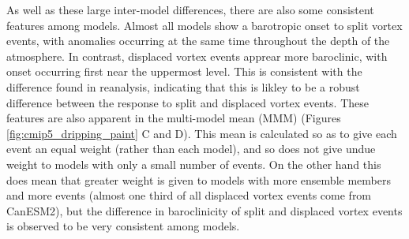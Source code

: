 As well as these large inter-model differences, there are also some consistent
features among models. Almost all models show a barotropic onset to split vortex
events, with anomalies occurring at the same time throughout the depth of the
atmosphere. In contrast, displaced vortex events apprear more baroclinic, with
onset occurring first near the uppermost level. This is consistent with the
difference found in reanalysis, indicating that this is likley to be a robust
difference between the response to split and displaced vortex events. These
features are also apparent in the multi-model mean (MMM) (Figures
\ref{fig:cmip5_dripping_paint} C and D). This mean is calculated so as to give
each event an equal weight (rather than each model), and so does not give undue
weight to models with only a small number of events. On the other hand this does
mean that greater weight is given to models with more ensemble members and more
events (almost one third of all displaced vortex events come from CanESM2), but
the difference in baroclinicity of split and displaced vortex events is observed
to be very consistent among models.

